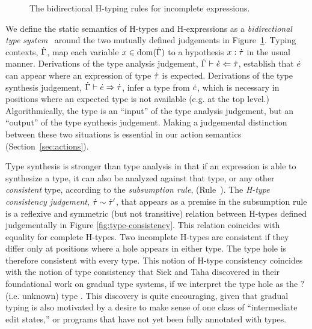 \begin{figure}
\caption{The bidirectional H-typing rules for incomplete expressions.\label{fig:ana-synth}}
\end{figure}
We define the static semantics of H-types and H-expressions as a \emph{bidirectional type
  system}~\citep{Pierce:2000:LTI:345099.345100,DBLP:conf/icfp/DaviesP00,DBLP:conf/tldi/ChlipalaPH05,bidi-tutorial}
around the two mutually defined judgements in Figure~\ref{fig:ana-synth}. Typing contexts, $\dot{\Gamma}$, map each variable $x \in
\text{dom}(\dot{\Gamma})$ to a hypothesis $x : \dot{\tau}$ in the usual manner. 
%
Derivations of the type analysis judgement, $\dot{\Gamma} \vdash \dot{e} \Leftarrow \dot{\tau}$,
establish that $\dot{e}$ can appear where an expression of type $\dot{\tau}$ is
expected. Derivations of the type synthesis judgement,
$\dot{\Gamma} \vdash \dot{e} \Rightarrow \dot{\tau}$, infer a type from $\dot{e}$, which is
necessary in positions where an expected type is not available (e.g. at the
top level.) Algorithmically, the type is an ``input'' of the type analysis
judgement, but an ``output'' of the type synthesis judgement.  Making a
judgemental distinction between these two situations is essential in our
action semantics (Section~\ref{sec:actions}).

Type synthesis is stronger than type analysis in that if an expression is
able to synthesize a type, it can also be analyzed against that type, or
any other \emph{consistent} type, according to the \emph{subsumption rule},
(Rule~).
The \emph{H-type consistency judgement}, $\dot{\tau} \sim \dot{\tau}'$, that
appears as a premise in the subsumption rule is a reflexive and symmetric
(but not transitive) relation between H-types defined judgementally in
Figure \ref{fig:type-consistency}. This relation coincides with equality
for complete H-types. Two incomplete H-types are consistent if they differ
only at positions where a hole appears in either type. The type hole is
therefore consistent with every type. This notion of H-type consistency
coincides with the notion of type consistency that Siek and Taha discovered
in their foundational work on gradual type systems, if we interpret the
type hole as the $?$ (i.e. unknown) type \citep{Siek06a}. This discovery is quite encouraging, given that gradual typing is also motivated by a 
desire to make sense of one class of ``intermediate edit states,'' or programs that
have not yet been fully annotated with types.

